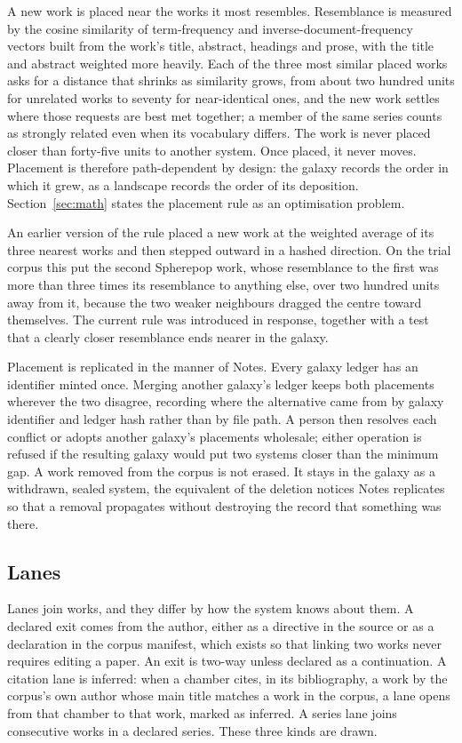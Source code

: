 \documentclass[11pt]{article}
\theoremstyle{remark}
\begin{document}
A new work is placed near the works it most resembles. Resemblance is measured by the cosine similarity of term-frequency and inverse-document-frequency vectors \cite{salton1988} built from the work's title, abstract, headings and prose, with the title and abstract weighted more heavily. Each of the three most similar placed works asks for a distance that shrinks as similarity grows, from about two hundred units for unrelated works to seventy for near-identical ones, and the new work settles where those requests are best met together; a member of the same series counts as strongly related even when its vocabulary differs. The work is never placed closer than forty-five units to another system. Once placed, it never moves. Placement is therefore path-dependent by design: the galaxy records the order in which it grew, as a landscape records the order of its deposition. Section~\ref{sec:math} states the placement rule as an optimisation problem.

An earlier version of the rule placed a new work at the weighted average of its three nearest works and then stepped outward in a hashed direction. On the trial corpus this put the second Spherepop work, whose resemblance to the first was more than three times its resemblance to anything else, over two hundred units away from it, because the two weaker neighbours dragged the centre toward themselves. The current rule was introduced in response, together with a test that a clearly closer resemblance ends nearer in the galaxy.

Placement is replicated in the manner of Notes. Every galaxy ledger has an identifier minted once. Merging another galaxy's ledger keeps both placements wherever the two disagree, recording where the alternative came from by galaxy identifier and ledger hash rather than by file path. A person then resolves each conflict or adopts another galaxy's placements wholesale; either operation is refused if the resulting galaxy would put two systems closer than the minimum gap. A work removed from the corpus is not erased. It stays in the galaxy as a withdrawn, sealed system, the equivalent of the deletion notices Notes replicates so that a removal propagates without destroying the record that something was there.

\subsection{Lanes}

Lanes join works, and they differ by how the system knows about them. A declared exit comes from the author, either as a directive in the source or as a declaration in the corpus manifest, which exists so that linking two works never requires editing a paper. An exit is two-way unless declared as a continuation. A citation lane is inferred: when a chamber cites, in its bibliography, a work by the corpus's own author whose main title matches a work in the corpus, a lane opens from that chamber to that work, marked as inferred. A series lane joins consecutive works in a declared series. These three kinds are drawn.
\end{document}
